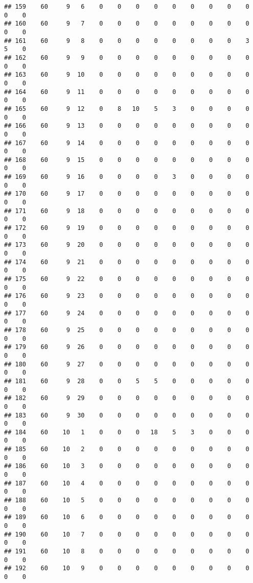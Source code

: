 \documentclass[]{article}
\begin{document}
\begin{verbatim}
## 159    60     9   6    0    0    0    0    0    0    0    0    0    0    0
## 160    60     9   7    0    0    0    0    0    0    0    0    0    0    0
## 161    60     9   8    0    0    0    0    0    0    0    0    3    5    0
## 162    60     9   9    0    0    0    0    0    0    0    0    0    0    0
## 163    60     9  10    0    0    0    0    0    0    0    0    0    0    0
## 164    60     9  11    0    0    0    0    0    0    0    0    0    0    0
## 165    60     9  12    0    8   10    5    3    0    0    0    0    0    0
## 166    60     9  13    0    0    0    0    0    0    0    0    0    0    0
## 167    60     9  14    0    0    0    0    0    0    0    0    0    0    0
## 168    60     9  15    0    0    0    0    0    0    0    0    0    0    0
## 169    60     9  16    0    0    0    0    3    0    0    0    0    0    0
## 170    60     9  17    0    0    0    0    0    0    0    0    0    0    0
## 171    60     9  18    0    0    0    0    0    0    0    0    0    0    0
## 172    60     9  19    0    0    0    0    0    0    0    0    0    0    0
## 173    60     9  20    0    0    0    0    0    0    0    0    0    0    0
## 174    60     9  21    0    0    0    0    0    0    0    0    0    0    0
## 175    60     9  22    0    0    0    0    0    0    0    0    0    0    0
## 176    60     9  23    0    0    0    0    0    0    0    0    0    0    0
## 177    60     9  24    0    0    0    0    0    0    0    0    0    0    0
## 178    60     9  25    0    0    0    0    0    0    0    0    0    0    0
## 179    60     9  26    0    0    0    0    0    0    0    0    0    0    0
## 180    60     9  27    0    0    0    0    0    0    0    0    0    0    0
## 181    60     9  28    0    0    5    5    0    0    0    0    0    0    0
## 182    60     9  29    0    0    0    0    0    0    0    0    0    0    0
## 183    60     9  30    0    0    0    0    0    0    0    0    0    0    0
## 184    60    10   1    0    0    0   18    5    3    0    0    0    0    0
## 185    60    10   2    0    0    0    0    0    0    0    0    0    0    0
## 186    60    10   3    0    0    0    0    0    0    0    0    0    0    0
## 187    60    10   4    0    0    0    0    0    0    0    0    0    0    0
## 188    60    10   5    0    0    0    0    0    0    0    0    0    0    0
## 189    60    10   6    0    0    0    0    0    0    0    0    0    0    0
## 190    60    10   7    0    0    0    0    0    0    0    0    0    0    0
## 191    60    10   8    0    0    0    0    0    0    0    0    0    0    0
## 192    60    10   9    0    0    0    0    0    0    0    0    0    0    0

\end{verbatim}
\end{document}
